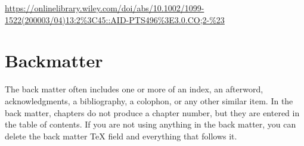\documentclass{book}\usepackage{knitr}
\begin{document}
\url{https://onlinelibrary.wiley.com/doi/abs/10.1002/1099-1522(200003/04)13:2%3C45::AID-PTS496%3E3.0.CO;2-%23}






\backmatter

\part{Backmatter}

The back matter often includes one or more of an index, an afterword, acknowledgments, a bibliography, a colophon, or any other similar item. In the back matter, chapters do not produce a chapter number, but they are entered in the table of contents. If you are not using anything in the back matter, you can delete the back matter TeX field and everything that follows it.

\printglossary

\renewcommand\bibname{References}
\setlength{\bibsep}{2\baselineskip}
\setlength\bibindent{.5in}


\end{document}

